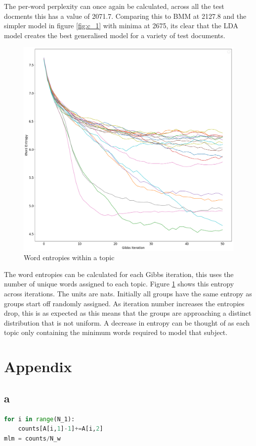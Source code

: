 \documentclass[twoside,twocolumn]{article}
\begin{document}
The per-word perplexity can once again be calculated, across all the test docments this has a value of 2071.7. Comparing this to BMM at 2127.8 and the simpler model in figure \ref{fig:c_1} with minima at 2675, its clear that the LDA model creates the best generalised model for a variety of test documents.

\begin{figure}[h]
  \centering
    \includegraphics[width=\linewidth]{e_3}
  \caption{Word entropies within a topic}
  \label{fig:e_3}
\end{figure}

The word entropies can be calculated for each Gibbs iteration, this uses the number of unique words assigned to each topic. Figure \ref{fig:e_3} shows this entropy across iterations. The units are nats.  Initially all groups have the same entropy as groups start off randomly assigned. As iteration number increases the entropies drop, this is as expected as this means that the groups are approaching a distinct distribution that is not uniform. A decrease in entropy can be thought of as each topic only containing the minimum words required to model that subject.

\section{Appendix}
\subsection{a}
\begin{lstlisting}[language=python]
for i in range(N_1):
    counts[A[i,1]-1]+=A[i,2]
mlm = counts/N_w
\end{lstlisting}
\end{document}
